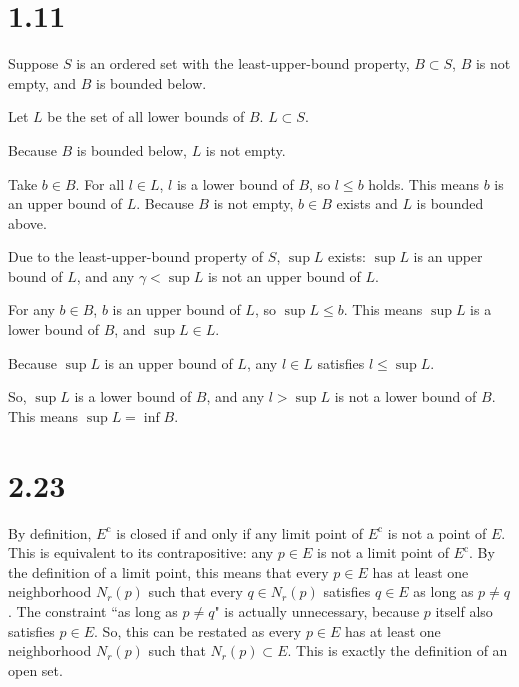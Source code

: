 \documentclass[uplatex]{jsarticle}
\begin{document}
\section{1.11}
	Suppose $S$ is an ordered set with the least-upper-bound property,
	$B \subset S$,
	$B$ is not empty,
	and $B$ is bounded below.

	Let $L$ be the set of all lower bounds of $B$. $L \subset S$.

	Because $B$ is bounded below, $L$ is not empty.

	Take $b \in B$.
	For all $l \in L$, $l$ is a lower bound of $B$,
	so $l \leq b$ holds.
	This means $b$ is an upper bound of $L$.
	Because $B$ is not empty,
	$b \in B$ exists
	and $L$ is bounded above.

	Due to the least-upper-bound property of $S$,
	$\sup L$ exists:
	$\sup L$ is an upper bound of $L$,
	and any $\gamma < \sup L$ is not an upper bound of $L$.

	For any $b \in B$,
	$b$ is an upper bound of $L$,
	so $\sup L \leq b$.
	This means $\sup L$ is a lower bound of $B$,
	and $\sup L \in L$.

	Because $\sup L$ is an upper bound of $L$,
	any $l \in L$ satisfies $l \leq \sup L$.

	So, $\sup L$ is a lower bound of $B$,
	and any $l > \sup L$ is not a lower bound of $B$.
	This means $\sup L = \inf B$.
\section{2.23}
\newcommand{\co}{\mathrm{c}}
	By definition,
	$E^\co$ is closed if and only if
	any limit point of $E^\co$ is not a point of $E$.
	This is equivalent to its contrapositive:
	any $p \in E$ is not a limit point of $E^\co$.
	By the definition of a limit point,
	this means that every $p \in E$
	has at least one neighborhood $N_r(p)$ such that
	every $q \in N_r(p)$ satisfies $q \in E$
	as long as $p \neq q$.
	The constraint ``as long as $p \neq q$" is
	actually unnecessary,
	because $p$ itself also satisfies $p \in E$.
	So, this can be restated as
	every $p \in E$ has at least one neighborhood $N_r(p)$
	such that $N_r(p) \subset E$.
	This is exactly the definition of an open set.
\end{document}
